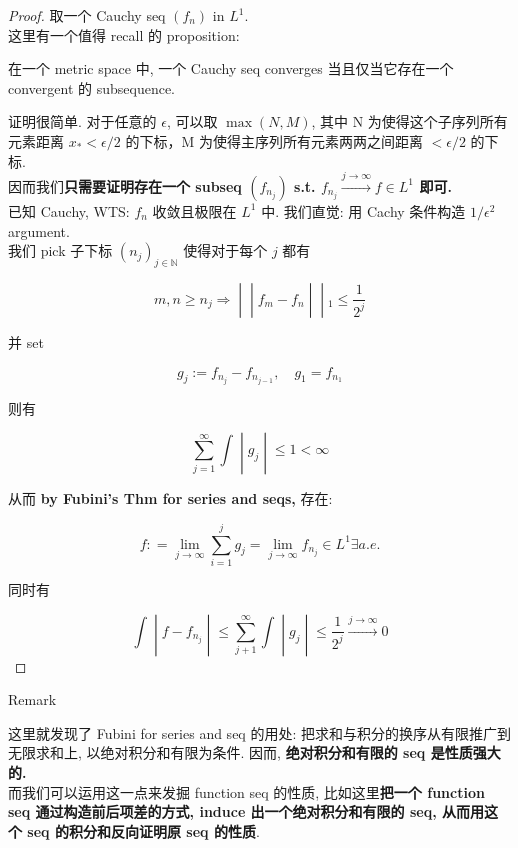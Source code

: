 \documentclass{qlnotes-export}
\begin{document}
\begin{proof}

取一个 Cauchy seq \((f_{n})\) in \(L^{1}\).\\
这里有一个值得 recall 的 proposition:

\begin{proposition}

在一个 metric space 中, 一个 Cauchy seq converges 当且仅当它存在一个 convergent 的 subsequence.

\end{proposition}

证明很简单. 对于任意的 \(\epsilon\), 可以取 \(\max(N,M)\), 其中 N 为使得这个子序列所有元素距离 \(x_{\ast} < \epsilon/2\) 的下标，M 为使得主序列所有元素两两之间距离 \(< \epsilon/2\) 的下标.\\
因而我们\textbf{只需要证明存在一个 subseq \((f_{n_{j}})\) s.t. \(f_{n_{j}}\overset{j\rightarrow\infty}{\rightarrow}f \in L^{1}\) 即可.}\\
已知 Cauchy, WTS: \(f_{n}\) 收敛且极限在 \(L^{1}\) 中. 我们直觉: 用 Cachy 条件构造 \(1/\epsilon^{2}\) argument.\\
我们 pick 子下标 \((n_{j})_{j \in {\mathbb{N}}}\) 使得对于每个 \(j\) 都有

\[\left. m,n \geq n_{j}\Longrightarrow \middle| \middle| f_{m} - f_{n} \middle| \middle| {}_{1} \leq \frac{1}{2^{j}} \right.\]

并 set

\[g_{j} := f_{n_{j}} - f_{n_{j - 1}},\quad g_{1} = f_{n_{1}}\]

则有

\[\left. \sum\limits_{j = 1}^{\infty}\int \middle| g_{j} \middle| \leq 1 < \infty \right.\]

从而 \textbf{by Fubini's Thm for series and seqs,} 存在:

\[f: = \lim\limits_{j\rightarrow\infty}\sum\limits_{i = 1}^{j}g_{j} = \lim\limits_{j\rightarrow\infty}f_{n_{j}} \in L^{1}\exists a.e.\]

同时有

\[\left. \int \middle| f - f_{n_{j}} \middle| \leq \sum\limits_{j + 1}^{\infty}\int \middle| g_{j} \middle| \leq \frac{1}{2^{j}}\overset{j\rightarrow\infty}{\rightarrow}0 \right.\]

\end{proof}

\begin{qlremark}{Remark}

这里就发现了 Fubini for series and seq 的用处: 把求和与积分的换序从有限推广到无限求和上, 以绝对积分和有限为条件. 因而, \textbf{绝对积分和有限的 seq 是性质强大的.}\\
而我们可以运用这一点来发掘 function seq 的性质, 比如这里\textbf{把一个 function seq 通过构造前后项差的方式, induce 出一个绝对积分和有限的 seq, 从而用这个 seq 的积分和反向证明原 seq 的性质}.

\end{qlremark}
\end{document}
